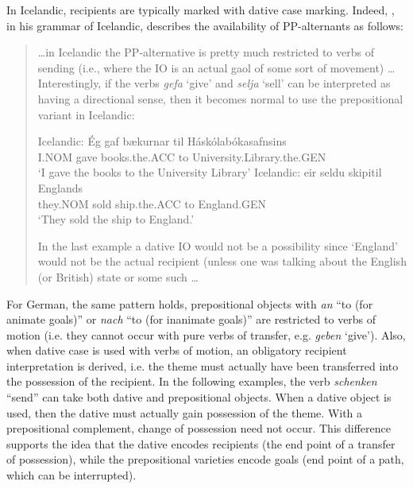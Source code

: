 	In Icelandic, recipients are typically marked with dative case marking. Indeed, \cite{Thrainsson.2007}, in his grammar of Icelandic, describes the availability of PP-alternants as follows: 
	\begin{quotation}
	\ldots in Icelandic the PP-alternative is pretty much restricted to verbs of sending (i.e., where the IO is an actual gaol of some sort of movement) \ldots Interestingly, if the verbs \textit{gefa} `give' and \textit{selja} `sell' can be interpreted as having a directional sense, then it becomes normal to use the prepositional variant in Icelandic:
	\begin{exe}
		\ex Icelandic: \label{ex:icelandic-goals}
		\gll \'{E}g gaf b\ae kurnar til H\'ask\'olab\'okasafnsins\\
		I.NOM gave books.the.ACC to University.Library.the.GEN\\
		\trans `I gave the books to the University Library'
		\ex Icelandic:
		\gll \th eir seldu skipi\dh til Englands\\
		they.NOM sold ship.the.ACC to England.GEN\\
		\trans `They sold the ship to England.'
	\end{exe}
	In the last example a dative IO would not be a possibility since `England' would not be the actual recipient (unless one was talking about the English (or British) state or some such \ldots \citep[fn 64]{Thrainsson.2007}
	\end{quotation}
	For German, the same pattern holds, prepositional objects with \textit{an} ``to (for animate goals)'' or \textit{nach} ``to (for inanimate goals)'' are restricted to verbs of motion (i.e. they cannot occur with pure verbs of transfer, e.g. \textit{geben} `give'). Also, when dative case is used with verbs of motion, an obligatory recipient interpretation is derived, i.e. the theme must actually have been transferred into the possession of the recipient. In the following examples, the verb \textit{schenken} ``send'' can take both dative and prepositional objects. When a dative object is used, then the dative must actually gain possession of the theme. With a prepositional complement, change of possession need not occur. This difference supports the idea that the dative encodes recipients (the end point of a transfer of possession), while the prepositional varieties encode goals (end point of a path, which can be interrupted).

